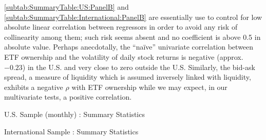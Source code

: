 \autoref{subtab:SummaryTable:US:PanelB} and \autoref{subtab:SummaryTable:International:PanelB} are essentially use to control for low absolute linear correlation between regressors in order to avoid any risk of collinearity among them; such risk seems absent and no coefficient is above 0.5 in absolute value. Perhaps anecdotally, the ``naïve'' univariate correlation between ETF ownership and the volatility of daily stock returns is negative (approx. $-0.23$) in the U.S. and very close to zero outside the U.S. Similarly, the bid-ask spread, a measure of liquidity which is assumed inversely linked with liquidity, exhibits a negative $\rho$ with ETF ownership while we may expect, in our multivariate tests, a positive correlation.
{\linespread{1.0}
\begin{landscape}
\begin{table}[htbp]
\caption{U.S. Sample (monthly) : Summary Statistics}
\label{tab:SummaryTable:US}
\begin{subtable}[t]{\linewidth}
\label{subtab:SummaryTable:US:PanelA}

\end{subtable}
\medskip
\newline
\begin{subtable}[t]{\linewidth}
\label{subtab:SummaryTable:US:PanelB}

\end{subtable}
\end{table}
\clearpage
\begin{table}[htbp]
\caption{International Sample : Summary Statistics}
\label{tab:SummaryTable:International}
\begin{subtable}[t]{\linewidth}
\label{subtab:SummaryTable:International:PanelA}

\end{subtable}
\medskip
\newline
\begin{subtable}[t]{\linewidth}
\label{subtab:SummaryTable:International:PanelB}

\end{subtable}
\end{table}
\end{landscape}
}
